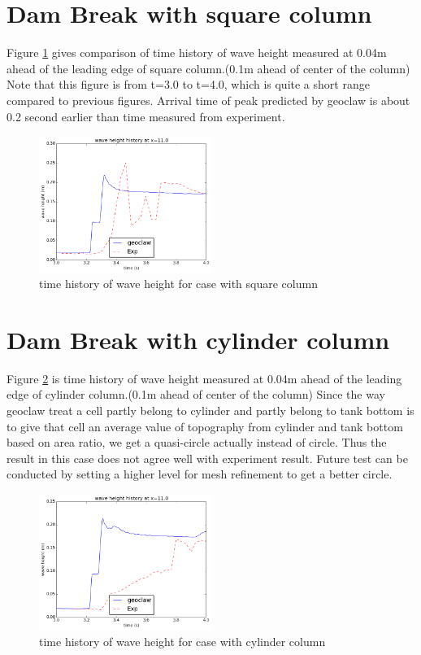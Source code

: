 \documentclass[11pt]{article}
\begin{document}
\section{Dam Break with square column}\label{Sec:Square}
Figure \ref{fig:waveheight_square_x=11.0} gives comparison of time history of wave height measured at 0.04m ahead of the leading edge of square column.(0.1m ahead of center of the column)
Note that this figure is from t=3.0 to t=4.0, which is quite a short range compared to previous figures.
Arrival time of peak predicted by geoclaw is about 0.2 second earlier than time measured from experiment. 
\begin{figure}[h!]
    \centering
    \includegraphics[width=0.5\textwidth]{../../dambreak/myplot/waveheight_square_x=11}
    \caption{time history of wave height for case with square column}
    \label{fig:waveheight_square_x=11.0}
\end{figure}



\section{Dam Break with cylinder column}\label{Sec:Cylinder}
Figure \ref{fig:waveheight_cylinder_x=11.0} is time history of wave height measured at 0.04m ahead of the leading edge of cylinder column.(0.1m ahead of center of the column)
Since the way geoclaw treat a cell partly belong to cylinder and partly belong to tank bottom is to give that cell an average value of topography from cylinder and tank bottom based on area ratio, we get a quasi-circle actually instead of circle. Thus the result in this case does not agree well with experiment result. 
Future test can be conducted by setting a higher level for mesh refinement to get a better circle.
\begin{figure}[h!]
    \centering
    \includegraphics[width=0.5\textwidth]{../../dambreak/myplot/waveheight_cylinder_x=11}
    \caption{time history of wave height for case with cylinder column}
    \label{fig:waveheight_cylinder_x=11.0}
\end{figure}
\end{document}
